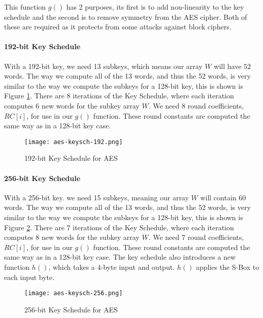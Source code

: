 This function $g()$ has 2 purposes, its first is to add non-linearity to the key schedule and the second is to remove symmetry from the AES cipher. Both of these are required as it protects from some attacks against block ciphers.  

\paragraph{192-bit Key Schedule}

With a 192-bit key, we need 13 subkeys, which means our array $W$ will have $52$ words. The way we compute all of the 13 words, and thus the 52 words, is very similar to the way we compute the subkeys for a 128-bit key, this is shown is Figure \ref{AES-KeySch-192}. There are 8 iterations of the Key Schedule, where each iteration computes 6 new words for the subkey array $W$. We need 8 round coefficients, $RC[i]$, for use in our $g()$ function. These round constants are computed the same way as in a 128-bit key case.

\begin{figure}[H]
\begin{center}
\texttt{[image: aes-keysch-192.png]}
\end{center}
\caption{192-bit Key Schedule for AES}
\label{AES-KeySch-192}
\end{figure}

\paragraph{256-bit Key Schedule}

With a 256-bit key. we need 15 subkeys, meaning our array $W$ will contain 60 words. The way we compute all of the 13 words, and thus the 52 words, is very similar to the way we compute the subkeys for a 128-bit key, this is shown is Figure \ref{AES-KeySch-256}. There are 7 iterations of the Key Schedule, where each iteration computes 8 new words for the subkey array $W$. We need 7 round coefficients, $RC[i]$, for use in our $g()$ function. These round constants are computed the same way as in a 128-bit key case. The key schedule also introduces a new function $h()$, which takes a 4-byte input and output. $h()$ applies the S-Box to each input byte. 

\begin{figure}[H]
\begin{center}
\texttt{[image: aes-keysch-256.png]}
\end{center}
\caption{256-bit Key Schedule for AES}
\label{AES-KeySch-256}
\end{figure}

